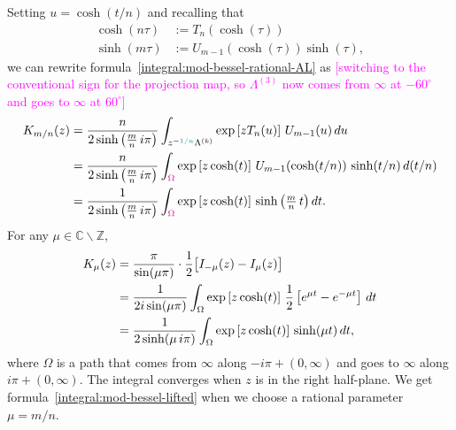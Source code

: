 \documentclass{article}
\theoremstyle{definition}
\newcommand{\Z}{\mathbb{Z}}
\newcommand{\C}{\mathbb{C}}
\begin{document}
Setting $u = \cosh(t/n)$ and recalling that
\begin{align*}
\cosh(n\tau) & := T_n(\cosh(\tau)) \\
\sinh(m\tau) & := U_{m-1}(\cosh(\tau)) \sinh(\tau),
\end{align*}
we can rewrite formula~\eqref{integral:mod-bessel-rational-AL} as \textcolor{magenta}{[switching to the conventional sign for the projection map, so $\Lambda^{(3)}$ now comes from $\infty$ at $-60^\circ$ and goes to $\infty$ at $60^\circ$]}
\begin{align}
\notag K_{m/n}(z) & = \frac{n}{2 \sinh\big(\tfrac{m}{n}\,i\pi\big)} \int_{z^{-\textcolor{DarkCyan}{1/n}}\Lambda^{(k)}} \exp\left[z T_n(u)\right]\,U_{m-1}(u)\,du \\
\notag & = \frac{n}{2 \sinh\big(\tfrac{m}{n}\,i\pi\big)} \int_{\textcolor{magenta}{\Omega}} \exp\left[z \cosh(t)\right]\,U_{m-1}(\cosh(t/n))\,\sinh(t/n)\,d(t/n) \\
\label{integral:mod-bessel-lifted} & = \frac{1}{2 \sinh\big(\tfrac{m}{n}\,i\pi\big)} \int_{\textcolor{magenta}{\Omega}} \exp\left[z \cosh(t)\right]\,\sinh\big(\tfrac{m}{n}\,t\big)\,dt.
\end{align}
For any $\mu \in \C \smallsetminus \Z$, 
\begin{align}
\notag K_\mu(z) & = \frac{\pi}{\sin(\mu \pi)} \cdot \frac{1}{2}\big[ I_{-\mu}(z) - I_\mu(z) \big] \\
\notag & = \frac{1}{2i \sin(\mu \pi)} \int_\Omega \exp\left[z \cosh(t)\right]\,\frac{1}{2}\left[e^{\mu t} - e^{-\mu t}\right]\,dt \\
& \label{int:mod-bessel-gen} = \frac{1}{2 \sinh(\mu\,i\pi)} \int_\Omega \exp\left[z \cosh(t)\right]\,\sinh(\mu t)\,dt,
\end{align}
where $\Omega$ is a path that comes from $\infty$ along $-i \pi + (0, \infty)$ and goes to $\infty$ along $i \pi + (0, \infty)$. The integral converges when $z$ is in the right half-plane. We get formula~\eqref{integral:mod-bessel-lifted} when we choose a rational parameter $\mu = m/n$.

\begin{center}
\end{center}
\end{document}
